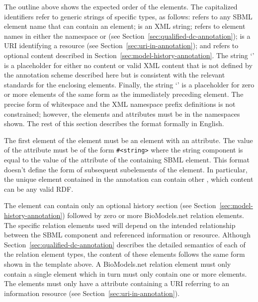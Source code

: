 The outline above shows the expected order of the elements.  The
capitalized identifiers refer to generic strings of specific
types, as follows: \sbmlElement refers to any SBML element name
that can contain an  element; \sbmlMeta is an
XML  string; \relationElement refers to element names
in either the namespace
{}
or {}
(see Section~\ref{sec:qualified-dc-annotation}); \resourceURI is a
URI identifying a resource (see
Section~\ref{sec:uri-in-annotation}); and \history refers to
optional content described in
Section~\ref{sec:model-history-annotation}.  The string
`\otherContent' is a placeholder for either no content or valid
XML content that is not defined by the annotation scheme described
here but is consistent with the relevant standards for the
enclosing elements.  Finally, the string `\moreOfTheSame' is a
placeholder for zero or more elements of the same form as the
immediately preceding element.  The precise form of whitespace and
the XML namespace prefix definitions is not constrained; however,
the elements and attributes must be in the namespaces shown. The
rest of this section describes the format formally in English.

The first element of the  element must be an
 element with an 
attribute. The value of the
 attribute must be of the form
\texttt{\#<string>} where the string component is equal to the
value of the  attribute of the containing SBML element.
This format doesn't define the form of subsequent
subelements of the  element. In particular, the unique  element contained in the annotation can contain other , which content can be any valid RDF.

The  element can contain only an optional
history section (see Section~\ref{sec:model-history-annotation})
followed by zero or more BioModels.net relation elements.  The
specific relation elements used will depend on the intended
relationship between the SBML component and referenced information
or resource.  Although Section~\ref{sec:qualified-dc-annotation}
describes the detailed semantics of each of the relation element
types, the content of these elements follows the same form shown
in the template above.  A BioModels.net relation element must only
contain a single  element which in turn must only
contain one or more  elements.  The 
elements must only have a  attribute
containing a URI referring to an information resource (see
Section~\ref{sec:uri-in-annotation}).

